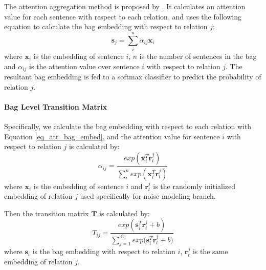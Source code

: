 The attention aggregation method is proposed by \cite{lin2016neural}. It calculates an attention value for each sentence with respect to each relation, and uses the following equation to calculate the bag embedding with respect to relation $j$:
\begin{equation}
\mathbf{s}_j = \sum_i^{n}{\alpha_{ij} \mathbf{x}_{i}}
\label{eq_att_bag_embed}
\end{equation}
where $\mathbf{x}_{i}$ is the embedding of sentence $i$, $n$ is the number of sentences in the bag and $\alpha_{ij}$ is the attention value over sentence $i$ with respect to relation $j$. The resultant bag embedding is fed to a softmax classifier to predict the probability of relation $j$.

\paragraph{Bag Level Transition Matrix}
 Specifically, we calculate the bag embedding with respect to each relation with Equation \ref{eq_att_bag_embed}, and the attention value for sentence $i$ with respect to relation $j$ is calculated by:
\begin{equation}
\alpha_{ij} = \frac{exp(\mathbf{x}_i^T \mathbf{r}_t^j)}{\sum_i^n{exp(\mathbf{x}_i^T \mathbf{r}_t^j)}}
\end{equation}
where $\mathbf{x}_i$ is the embedding of sentence $i$ and $\mathbf{r}_t^j$ is the randomly initialized embedding of relation $j$ used specifically for noise modeling branch.

Then the transition matrix $\mathbf{T}$ is calculated by:
\begin{equation}
T_{ij} = \frac{exp({\mathbf{s}_i^T \mathbf{r}_t^j  + b})}{\sum_{j=1}^{|\mathbb{C}|}{exp(\mathbf{s}_i^T \mathbf{r}_t^j + b})}
\end{equation}
where $\mathbf{s}_i$ is the bag embedding with respect to relation $i$, $\mathbf{r}_t^j$ is the same embedding of relation $j$.


